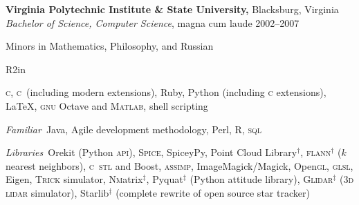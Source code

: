 \documentclass[12pt,letterpaper]{article}
\newenvironment{itemize*}%
{\begin{itemize}%
  \setlength{\itemsep}{0pt}}%
{\end{itemize}}
\newcommand{\Cpp}{\textsc{c}\nolinebreak[4]\hspace{-.05em}\raisebox{.4ex}{\relsize{-3}{\textbf{++}}}}
\newcommand{\Magickpp}{Magick\nolinebreak[4]\hspace{-.05em}\raisebox{.4ex}{\relsize{-3}{\textbf{++}}}}
\newcommand{\mhead}[1]{\leavevmode\marginpar{\sffamily\footnotesize #1}}
\newcommand{\rdate}[1]{{\hfill #1}}
\begin{document}
\medskip
\textbf{Virginia Polytechnic Institute \& State University,} Blacksburg, Virginia \newline
\emph{Bachelor of Science, Computer Science}, magna cum laude \rdate{2002--2007}
\begin{itemize*}
  \item Minors in Mathematics, Philosophy, and Russian
\end{itemize*}
%
\begin{wrapfigure}{R}{2in}
\vspace{-25pt}%
\centering%
\vspace{-15pt}%
\end{wrapfigure}%
%
\bigskip
\mhead{Coding \newline Proficiencies}%
\textsc{c},
\Cpp\ (including modern extensions),
Ruby,
Python (including \textsc{c} extensions),
\LaTeX,
\textsc{gnu} Octave and \textsc{Matlab},
shell scripting%

\medskip
\emph{Familiar}\ 
Java, Agile development methodology, Perl,
\textsc{R},
\textsc{sql}

\medskip
\emph{Libraries}\ 
Orekit (Python \textsc{api}),
\textsc{Spice}, SpiceyPy,
Point Cloud Library$^\dagger$,
\textsc{flann}$^\dagger$ ($k$ nearest neighbors),
\Cpp\ \textsc{stl} and Boost,
\textsc{assimp},
ImageMagick/\Magickpp,
Open\textsc{gl},
\textsc{glsl},
Eigen,
\textsc{Trick} simulator,
\textsc{Nm}atrix$^\ddagger$,
Pyquat$^\ddagger$ (Python attitude library),
\textsc{Glidar}$^\ddagger$ (\textsc{3d lidar} simulator),
Starlib$^\ddagger$ (complete rewrite of open source star tracker)
\end{document}
